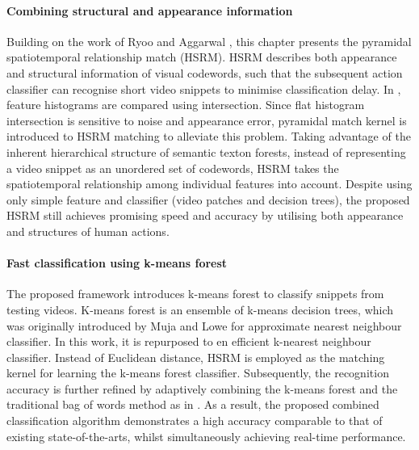\paragraph{Combining structural and appearance information}
Building on the work of Ryoo and Aggarwal \cite{Ryoo2009}, this chapter presents the pyramidal spatiotemporal relationship match (HSRM). 
HSRM describes both appearance and structural information of visual codewords, such that the subsequent action classifier can recognise short video snippets to minimise classification delay. 
In \cite{Ryoo2009}, feature histograms are compared using intersection. 
Since flat histogram intersection is sensitive to noise and appearance error, pyramidal match kernel \cite{Grauman2005} is introduced to HSRM matching to alleviate this problem. 
Taking advantage of the inherent hierarchical structure of semantic texton forests, instead of representing a video snippet as an unordered set of codewords, HSRM takes the spatiotemporal relationship among individual features into account. 
Despite using only simple feature and classifier (video patches and decision trees), the proposed HSRM still achieves promising speed and accuracy by utilising both appearance and structures of human actions. 


\paragraph{Fast classification using k-means forest} 
The proposed framework introduces k-means forest to classify snippets from testing videos. 
K-means forest is an ensemble of k-means decision trees, which was originally introduced by Muja and Lowe \cite{Muja2009} for approximate nearest neighbour classifier. In this work, it is repurposed to en efficient k-nearest neighbour classifier. Instead of Euclidean distance, HSRM is employed as the matching kernel for learning the k-means forest classifier.  
Subsequently, the recognition accuracy is further refined by adaptively combining the k-means forest and the traditional bag of words method as in \cite{Shotton2008}. 
As a result, the proposed combined classification algorithm demonstrates a high accuracy comparable to that of existing state-of-the-arts, whilst simultaneously achieving real-time performance. 

